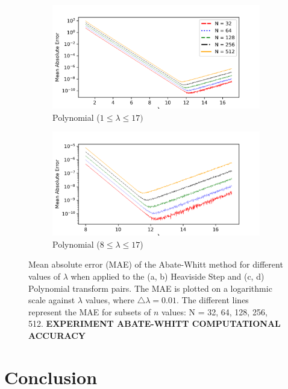 \documentclass[a4paper]{report}
\begin{document}
\begin{figure}[H]
    \begin{subfigure}{.5\linewidth}
      \includegraphics[width=\linewidth]{images/abate_whitt/polynomial.png}
      \caption{Polynomial ($1 \leq \lambda \leq 17)$}
    \end{subfigure}\hfill
    \begin{subfigure}{.5\linewidth}
      \includegraphics[width=\linewidth]{images/abate_whitt/polynomial_zoomed.png}
      \caption{Polynomial ($8 \leq \lambda \leq 17$)}
    \end{subfigure}
    
    \caption{Mean absolute error (MAE) of the Abate-Whitt method for different values of $\lambda$ when applied to the (a, b) Heaviside Step and (c, d) Polynomial transform pairs. The MAE is plotted on a logarithmic scale against $\lambda$ values, where $\triangle \lambda = 0.01$. The different lines represent the MAE for subsets of $n$ values: N = 32, 64, 128, 256, 512. \textbf{EXPERIMENT ABATE-WHITT COMPUTATIONAL ACCURACY}}
    \label{fig:MAE_Abate_Whitt}
\end{figure}

\chapter{Conclusion}
\end{document}
